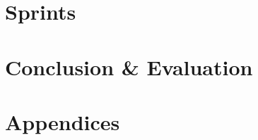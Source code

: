 \documentclass[a4paper, 11pt]{report}
\begin{document}










\part{Sprints}







\part{Conclusion \& Evaluation}




\part{Appendices}
\appendix




\end{document}
